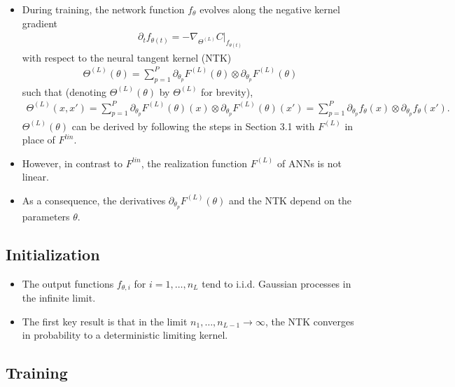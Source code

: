 \documentclass[10pt]{article}
\newcommand{\paran}[1]{{( #1 )}}
\begin{document}
\begin{itemize}
\item During training, the network function $f_\theta$ evolves along the negative kernel gradient
\begin{align*}
\partial_t f_{\theta(t)} = -\nabla_{\Theta^\paran{L}} C|_{f_{\theta(t)}}
\end{align*}
with respect to the neural tangent kernel (NTK)
\begin{align*}
\Theta^\paran{L}(\theta) = \sum_{p = 1}^P \partial_{\theta_p} F^\paran{L}(\theta) \otimes \partial_{\theta_p} F^\paran{L}(\theta)
\end{align*}
such that (denoting $\Theta^\paran{L}(\theta)$ by $\Theta^\paran{L}$ for brevity),
\begin{align*}
\Theta^\paran{L}(x,x') = \sum_{p = 1}^P \partial_{\theta_p} F^\paran{L}(\theta)(x) \otimes \partial_{\theta_p} F^\paran{L}(\theta)(x') = \sum_{p = 1}^P \partial_{\theta_p} f_\theta(x) \otimes \partial_{\theta_p} f_\theta(x').
\end{align*}
$\Theta^\paran{L}(\theta)$ can be derived by following the steps in Section 3.1 with $F^\paran{L}$ in place of $F^{lin}$.
\item However, in contrast to $F^{lin}$, the realization function $F^\paran{L}$ of ANNs is not linear.
\item As a consequence, the derivatives $\partial_{\theta_p} F^\paran{L}(\theta)$ and the NTK depend on the parameters $\theta$.
\end{itemize}

\subsection{Initialization}

\begin{itemize}
\item The output functions $f_{\theta,i}$ for $i = 1, \ldots, n_L$ tend to i.i.d. Gaussian processes in the infinite limit.
\item The first key result is that in the limit $n_1, \ldots, n_{L - 1} \rightarrow \infty$, the NTK converges in probability to a deterministic limiting kernel.
\end{itemize}

\subsection{Training}
\end{document}
